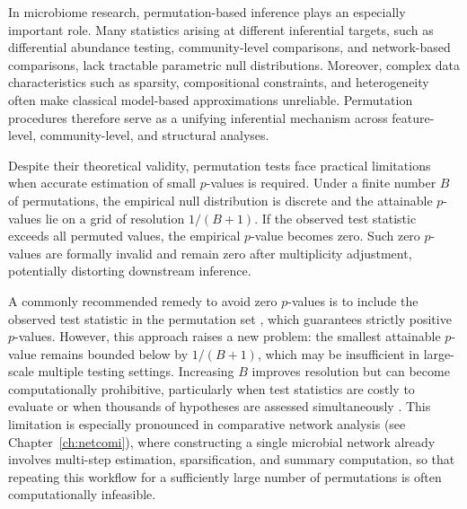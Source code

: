 In microbiome research, permutation-based inference plays an especially important role. 
Many statistics arising at different inferential targets, such as differential abundance testing, community-level comparisons, and network-based comparisons, lack tractable parametric null distributions. 
Moreover, complex data characteristics such as sparsity, compositional constraints, and heterogeneity often make classical model-based approximations unreliable. 
Permutation procedures therefore serve as a unifying inferential mechanism across feature-level, community-level, and structural analyses.

Despite their theoretical validity, permutation tests face practical limitations when accurate estimation of small $p$-values is required. Under a finite number $B$ of permutations, the empirical null distribution is discrete and the attainable $p$-values lie on a grid of resolution $1/(B+1)$. If the observed test statistic exceeds all permuted values, the empirical $p$-value becomes zero. 
Such zero $p$-values are formally invalid \citep{phipson2010permutation} and remain zero after multiplicity adjustment, potentially distorting downstream inference.

A commonly recommended remedy to avoid zero $p$-values is to include the observed test statistic in the permutation set \citep{north2002note,phipson2010permutation}, which guarantees strictly positive $p$-values. However, this approach raises a new problem: the smallest attainable $p$-value remains bounded below by $1/(B+1)$, which may be insufficient in large-scale multiple testing settings. Increasing $B$ improves resolution but can become computationally prohibitive, particularly when test statistics are costly to evaluate or when thousands of hypotheses are assessed simultaneously \citep{john2022efficient}. 
This limitation is especially pronounced in comparative network analysis (see Chapter~\ref{ch:netcomi}), where constructing a single microbial network already involves multi-step estimation, sparsification, and summary computation, so that repeating this workflow for a sufficiently large number of permutations is often computationally infeasible.


